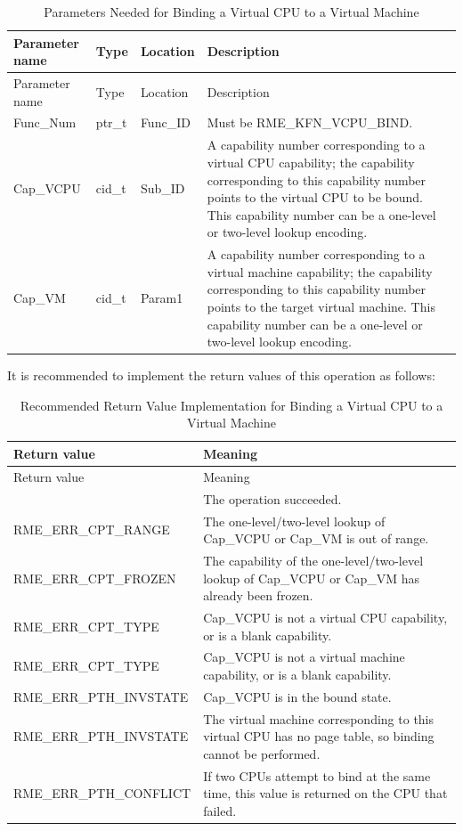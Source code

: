 \begin{xltabular}{\textwidth}{@{}>{\hsize\raggedright\arraybackslash}X>{\hsize\raggedright\arraybackslash}X>{\hsize\raggedright\arraybackslash}X>{\hsize\raggedright\arraybackslash}X@{}}
\caption{Parameters Needed for Binding a Virtual CPU to a Virtual Machine}\label{tab:8-83-bind-virtual-cpu-to-virtual-machine-parameters}\\
\toprule
Parameter name & Type & Location & Description\tabularnewline
\endfirsthead
\toprule
Parameter name & Type & Location & Description\tabularnewline
\midrule
\endhead
\bottomrule
\endlastfoot
Func\_Num & ptr\_t & Func\_ID &
Must be RME\_KFN\_VCPU\_BIND.\tabularnewline
Cap\_VCPU & cid\_t & Sub\_ID &
A capability number corresponding to a virtual CPU capability; the capability corresponding to this capability number points to the virtual CPU to be bound. This capability number can be a one-level or two-level lookup encoding.\tabularnewline
Cap\_VM & cid\_t & Param1 &
A capability number corresponding to a virtual machine capability; the capability corresponding to this capability number points to the target virtual machine. This capability number can be a one-level or two-level lookup encoding.\tabularnewline
\end{xltabular}
\nopagebreak[4]

It is recommended to implement the return values of this operation as follows:

\begin{xltabular}{\textwidth}{@{}>{\hsize\raggedright\arraybackslash}X>{\hsize\raggedright\arraybackslash}X@{}}
\caption{Recommended Return Value Implementation for Binding a Virtual CPU to a Virtual Machine}\label{tab:8-84-bind-virtual-cpu-to-virtual-machine-suggested-return-values}\\
\toprule
Return value & Meaning\tabularnewline
\endfirsthead
\toprule
Return value & Meaning\tabularnewline
\midrule
\endhead
\bottomrule
{} & The operation succeeded.\tabularnewline
    RME\_ERR\_CPT\_RANGE & The one-level/two-level lookup of Cap\_VCPU or Cap\_VM is out of range.\tabularnewline
    RME\_ERR\_CPT\_FROZEN & The capability of the one-level/two-level lookup of Cap\_VCPU or Cap\_VM has already been frozen.\tabularnewline
    RME\_ERR\_CPT\_TYPE & Cap\_VCPU is not a virtual CPU capability, or is a blank capability.\tabularnewline
    RME\_ERR\_CPT\_TYPE & Cap\_VCPU is not a virtual machine capability, or is a blank capability.\tabularnewline
    RME\_ERR\_PTH\_INVSTATE & Cap\_VCPU is in the bound state.\tabularnewline
    RME\_ERR\_PTH\_INVSTATE & The virtual machine corresponding to this virtual CPU has no page table, so binding cannot be performed.\tabularnewline
    RME\_ERR\_PTH\_CONFLICT & If two CPUs attempt to bind at the same time, this value is returned on the CPU that failed.\tabularnewline
\end{xltabular}
\nopagebreak[4]

